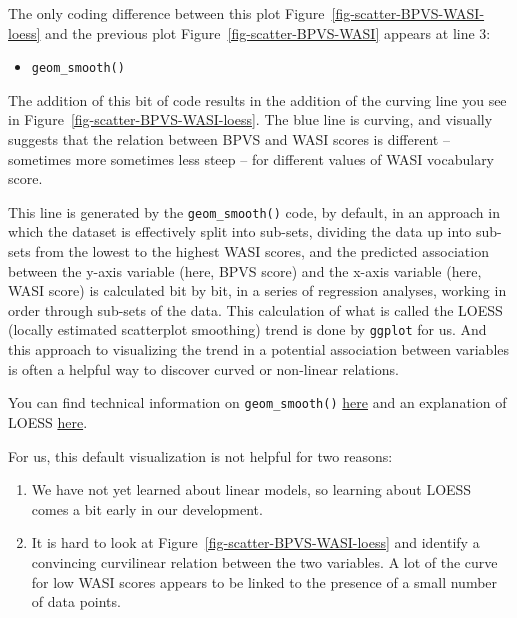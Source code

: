 \documentclass[
  letterpaper,
  DIV=11,
  numbers=noendperiod]{scrreprt}
\providecommand{\tightlist}{%
  \setlength{\itemsep}{0pt}\setlength{\parskip}{0pt}}\usepackage{longtable,booktabs,array}
\begin{document}
The only coding difference between this plot
Figure~\ref{fig-scatter-BPVS-WASI-loess} and the previous plot
Figure~\ref{fig-scatter-BPVS-WASI} appears at line 3:

\begin{itemize}
\tightlist
\item
  \texttt{geom\_smooth()}
\end{itemize}

The addition of this bit of code results in the addition of the curving
line you see in Figure~\ref{fig-scatter-BPVS-WASI-loess}. The blue line
is curving, and visually suggests that the relation between BPVS and
WASI scores is different -- sometimes more sometimes less steep -- for
different values of WASI vocabulary score.

This line is generated by the \texttt{geom\_smooth()} code, by default,
in an approach in which the dataset is effectively split into sub-sets,
dividing the data up into sub-sets from the lowest to the highest WASI
scores, and the predicted association between the y-axis variable (here,
BPVS score) and the x-axis variable (here, WASI score) is calculated bit
by bit, in a series of regression analyses, working in order through
sub-sets of the data. This calculation of what is called the LOESS
(locally estimated scatterplot smoothing) trend is done by
\texttt{ggplot} for us. And this approach to visualizing the trend in a
potential association between variables is often a helpful way to
discover curved or non-linear relations.

You can find technical information on \texttt{geom\_smooth()}
\href{https://ggplot2.tidyverse.org/reference/geom_smooth.html}{here}
and an explanation of LOESS
\href{https://en.wikipedia.org/wiki/Local_regression}{here}.

For us, this default visualization is not helpful for two reasons:

\begin{enumerate}
\def\labelenumi{\arabic{enumi}.}
\tightlist
\item
  We have not yet learned about linear models, so learning about LOESS
  comes a bit early in our development.
\item
  It is hard to look at Figure~\ref{fig-scatter-BPVS-WASI-loess} and
  identify a convincing curvilinear relation between the two variables.
  A lot of the curve for low WASI scores appears to be linked to the
  presence of a small number of data points.
\end{enumerate}
\end{document}
